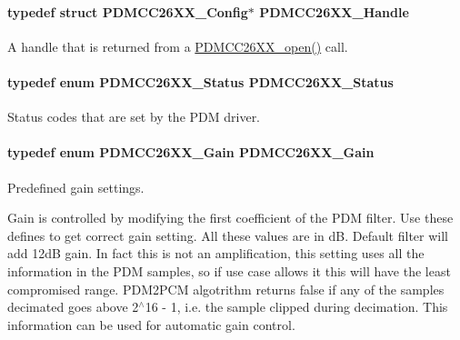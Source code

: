 \paragraph[{P\+D\+M\+C\+C26\+X\+X\+\_\+\+Handle}]{\setlength{\rightskip}{0pt plus 5cm}typedef struct {\bf P\+D\+M\+C\+C26\+X\+X\+\_\+\+Config}$\ast$ {\bf P\+D\+M\+C\+C26\+X\+X\+\_\+\+Handle}}\label{_p_d_m_c_c26_x_x_8h_ae5b9ecc0f8eb494e162b4a0a49c0636a}


A handle that is returned from a \hyperlink{_p_d_m_c_c26_x_x_8h_a431d9b71e0d0eebd5ab85960f1c82ee0}{P\+D\+M\+C\+C26\+X\+X\+\_\+open()} call. 

\paragraph[{P\+D\+M\+C\+C26\+X\+X\+\_\+\+Status}]{\setlength{\rightskip}{0pt plus 5cm}typedef enum {\bf P\+D\+M\+C\+C26\+X\+X\+\_\+\+Status}  {\bf P\+D\+M\+C\+C26\+X\+X\+\_\+\+Status}}\label{_p_d_m_c_c26_x_x_8h_affb09af7b7de674b100b1170d574f86c}


Status codes that are set by the P\+D\+M driver. 

\paragraph[{P\+D\+M\+C\+C26\+X\+X\+\_\+\+Gain}]{\setlength{\rightskip}{0pt plus 5cm}typedef enum {\bf P\+D\+M\+C\+C26\+X\+X\+\_\+\+Gain}  {\bf P\+D\+M\+C\+C26\+X\+X\+\_\+\+Gain}}\label{_p_d_m_c_c26_x_x_8h_a62dc3dc8663629a376fc5e4e546bfd05}


Predefined gain settings. 

Gain is controlled by modifying the first coefficient of the P\+D\+M filter. Use these defines to get correct gain setting. All these values are in d\+B. Default filter will add 12d\+B gain. In fact this is not an amplification, this setting uses all the information in the P\+D\+M samples, so if use case allows it this will have the least compromised range. P\+D\+M2\+P\+C\+M algotrithm returns false if any of the samples decimated goes above 2$^\wedge$16 -\/ 1, i.\+e. the sample clipped during decimation. This information can be used for automatic gain control. 
